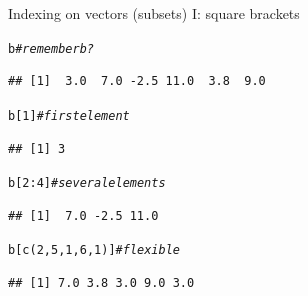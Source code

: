 \documentclass[xcolor=table,       handout,    xcolor=dvipsnames]{beamer}\usepackage[]{graphicx}\usepackage[]{color}
\makeatletter
\newcommand{\hlnum}[1]{\textcolor[rgb]{0,0,0}{#1}}
\newcommand{\hlcom}[1]{\textcolor[rgb]{0,0.392,0}{\textit{#1}}}
\newcommand{\hlopt}[1]{\textcolor[rgb]{0,0,0}{#1}}
\newcommand{\hlstd}[1]{\textcolor[rgb]{0,0,0}{#1}}
\newcommand{\hlkwd}[1]{\textcolor[rgb]{0,0,1}{#1}}
\newenvironment{kframe}{%
 \def\at@end@of@kframe{}%
 \ifinner\ifhmode%
  \def\at@end@of@kframe{\end{minipage}}%
  \begin{minipage}{\columnwidth}%
 \fi\fi%
 \def\FrameCommand##1{\hskip\@totalleftmargin \hskip-\fboxsep
 \colorbox{shadecolor}{##1}\hskip-\fboxsep
     \hskip-\linewidth \hskip-\@totalleftmargin \hskip\columnwidth}%
 \MakeFramed {\advance\hsize-\width
   \@totalleftmargin\z@ \linewidth\hsize
   \@setminipage}}%
 {\par\unskip\endMakeFramed%
 \at@end@of@kframe}
\newenvironment{knitrout}{}{} %
\makeatother
\begin{document}
\begin{frame}[fragile]{Indexing on vectors (subsets) I: square brackets}
\begin{knitrout}
\color{fgcolor}\begin{kframe}
\begin{alltt}
\hlstd{b} \hlcom{# remember b?}
\end{alltt}
\begin{verbatim}
## [1]  3.0  7.0 -2.5 11.0  3.8  9.0
\end{verbatim}
\begin{alltt}
\hlstd{b[}\hlnum{1}\hlstd{]} \hlcom{# first element}
\end{alltt}
\begin{verbatim}
## [1] 3
\end{verbatim}
\end{kframe}
\end{knitrout}
\begin{knitrout}
\color{fgcolor}\begin{kframe}
\begin{alltt}
\hlstd{b[}\hlnum{2}\hlopt{:}\hlnum{4}\hlstd{]} \hlcom{# several elements}
\end{alltt}
\begin{verbatim}
## [1]  7.0 -2.5 11.0
\end{verbatim}
\begin{alltt}
\hlstd{b[} \hlkwd{c}\hlstd{(}\hlnum{2}\hlstd{,}\hlnum{5}\hlstd{,}\hlnum{1}\hlstd{,}\hlnum{6}\hlstd{,}\hlnum{1}\hlstd{) ]} \hlcom{# flexible}
\end{alltt}
\begin{verbatim}
## [1] 7.0 3.8 3.0 9.0 3.0
\end{verbatim}
\end{kframe}
\end{knitrout}
\end{frame}

\end{document}
